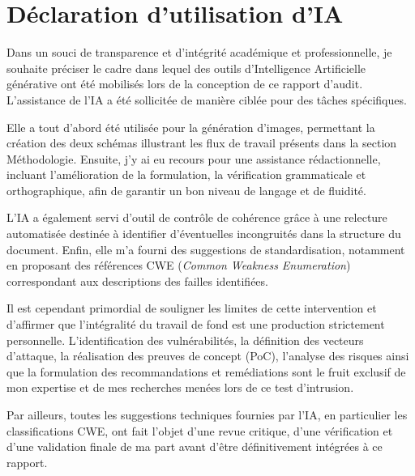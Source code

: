 \newpage
\section*{Déclaration d'utilisation d'IA}

Dans un souci de transparence et d'intégrité académique et professionnelle, je souhaite préciser le cadre dans lequel des outils d'Intelligence Artificielle générative ont été mobilisés lors de la conception de ce rapport d'audit. L'assistance de l'IA a été sollicitée de manière ciblée pour des tâches spécifiques. 

Elle a tout d'abord été utilisée pour la génération d'images, permettant la création des deux schémas illustrant les flux de travail présents dans la section Méthodologie. Ensuite, j'y ai eu recours pour une assistance rédactionnelle, incluant l'amélioration de la formulation, la vérification grammaticale et orthographique, afin de garantir un bon niveau de langage et de fluidité.

L'IA a également servi d'outil de contrôle de cohérence grâce à une relecture automatisée destinée à identifier d'éventuelles incongruités dans la structure du document. Enfin, elle m'a fourni des suggestions de standardisation, notamment en proposant des références CWE (\textit{Common Weakness Enumeration}) correspondant aux descriptions des failles identifiées.

Il est cependant primordial de souligner les limites de cette intervention et d'affirmer que l'intégralité du travail de fond est une production strictement personnelle. L'identification des vulnérabilités, la définition des vecteurs d'attaque, la réalisation des preuves de concept (PoC), l'analyse des risques ainsi que la formulation des recommandations et remédiations sont le fruit exclusif de mon expertise et de mes recherches menées lors de ce test d'intrusion. 

Par ailleurs, toutes les suggestions techniques fournies par l'IA, en particulier les classifications CWE, ont fait l'objet d'une revue critique, d'une vérification et d'une validation finale de ma part avant d'être définitivement intégrées à ce rapport.